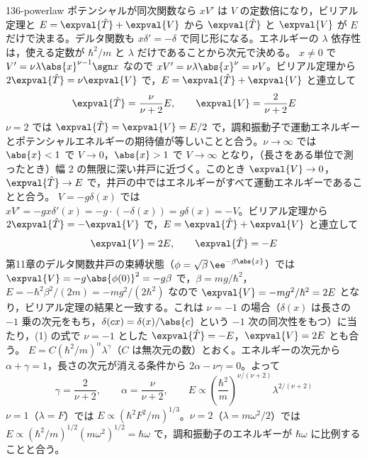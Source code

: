 \documentclass[uplatex,dvipdfmx,a4paper,11pt]{jsarticle}
\begin{document}
\begin{kaisetsu}{136-powerlaw}
\houshin ポテンシャルが同次関数なら $xV'$ は $V$ の定数倍になり，ビリアル定理と $E=\expval{\hat{T}}+\expval{V}$ から $\expval{\hat{T}}$ と $\expval{V}$ が $E$ だけで決まる。デルタ関数も $x\delta'=-\delta$ で同じ形になる。エネルギーの $\lambda$ 依存性は，使える定数が $\hbar^{2}/m$ と $\lambda$ だけであることから次元で決める。
\keisan
{} $x\neq0$ で $V'=\nu\lambda\abs{x}^{\nu-1}\sgn x$ なので $xV'=\nu\lambda\abs{x}^{\nu}=\nu V$。ビリアル定理から $2\expval{\hat{T}}=\nu\expval{V}$ で，$E=\expval{\hat{T}}+\expval{V}$ と連立して
\[ \expval{\hat{T}}=\frac{\nu}{\nu+2}E,\qquad \expval{V}=\frac{2}{\nu+2}E \]
$\nu=2$ では $\expval{\hat{T}}=\expval{V}=E/2$ で，調和振動子で運動エネルギーとポテンシャルエネルギーの期待値が等しいことと合う。$\nu\to\infty$ では $\abs{x}<1$ で $V\to0$，$\abs{x}>1$ で $V\to\infty$ となり，（長さをある単位で測ったとき）幅 $2$ の無限に深い井戸に近づく。このとき $\expval{V}\to0$，$\expval{\hat{T}}\to E$ で，井戸の中ではエネルギーがすべて運動エネルギーであることと合う。
 $V=-g\delta(x)$ では $xV'=-gx\delta'(x)=-g\cdot(-\delta(x))=g\delta(x)=-V$。ビリアル定理から $2\expval{\hat{T}}=-\expval{V}$ で，$E=\expval{\hat{T}}+\expval{V}$ と連立して
\[ \expval{V}=2E,\qquad \expval{\hat{T}}=-E \]
第11章のデルタ関数井戸の束縛状態（$\phi=\sqrt{\beta}\,\ee^{-\beta\abs{x}}$）では $\expval{V}=-g\abs{\phi(0)}^{2}=-g\beta$ で，$\beta=mg/\hbar^{2}$，$E=-\hbar^{2}\beta^{2}/(2m)=-mg^{2}/(2\hbar^{2})$ なので $\expval{V}=-mg^{2}/\hbar^{2}=2E$ となり，ビリアル定理の結果と一致する。これは $\nu=-1$ の場合（$\delta(x)$ は長さの $-1$ 乗の次元をもち，$\delta(cx)=\delta(x)/\abs{c}$ という $-1$ 次の同次性をもつ）に当たり，(1) の式で $\nu=-1$ とした $\expval{\hat{T}}=-E$，$\expval{V}=2E$ とも合う。
 $E=C(\hbar^{2}/m)^{\alpha}\lambda^{\gamma}$（$C$ は無次元の数）とおく。エネルギーの次元から $\alpha+\gamma=1$，長さの次元が消える条件から $2\alpha-\nu\gamma=0$。よって
\[ \gamma=\frac{2}{\nu+2},\qquad \alpha=\frac{\nu}{\nu+2},\qquad E\propto\left(\frac{\hbar^{2}}{m}\right)^{\nu/(\nu+2)}\lambda^{2/(\nu+2)} \]
$\nu=1$（$\lambda=F$）では $E\propto(\hbar^{2}F^{2}/m)^{1/3}$。$\nu=2$（$\lambda=m\omega^{2}/2$）では $E\propto(\hbar^{2}/m)^{1/2}(m\omega^{2})^{1/2}=\hbar\omega$ で，調和振動子のエネルギーが $\hbar\omega$ に比例することと合う。

\end{kaisetsu}
\end{document}
